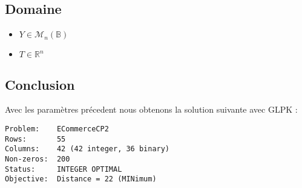 \subsection{Domaine}

\begin{itemize}
\item $Y \in \mathcal{M}_n(\mathbb{B}) $
\item $T \in \mathbb{R}^{n}$
\end{itemize}

\subsection{Conclusion}
Avec les paramètres précedent nous obtenons la solution suivante avec GLPK :
\begin{lstlisting}
Problem:    ECommerceCP2
Rows:       55
Columns:    42 (42 integer, 36 binary)
Non-zeros:  200
Status:     INTEGER OPTIMAL
Objective:  Distance = 22 (MINimum)


\end{lstlisting}
